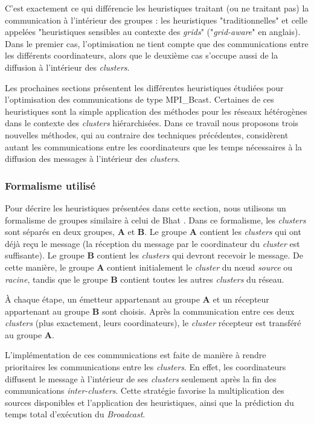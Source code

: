 C'est exactement ce qui différencie les heuristiques traitant (ou
ne traitant pas) la communication à l'intérieur des groupes : les
heuristiques "traditionnelles" et celle appelées "heuristiques
sensibles au contexte des \textit{grids}" ("\emph{grid-aware}"
en anglais). Dans le premier cas, l'optimisation ne tient compte que
des communications entre les différents coordinateurs, alors que le
deuxième cas s'occupe aussi de la diffusion à l'intérieur des  \textit{clusters}. 


Les prochaines sections présentent les différentes heuristiques étudiées
pour l'optimisation des communications de type MPI\_Bcast. Certaines
de ces heuristiques sont la simple application des méthodes pour les
réseaux hétérogènes dans le contexte des  \textit{clusters} hiérarchisées. Dans
ce travail nous proposons trois nouvelles méthodes, qui au contraire
des techniques précédentes, considèrent autant les communications
entre les coordinateurs que les temps nécessaires à la diffusion des
messages à l'intérieur des  \textit{clusters}.


\subsubsection*{Formalisme utilisé}

Pour décrire les heuristiques présentées dans cette section, nous
utilisons un formalisme de groupes similaire à celui de Bhat \cite{Bhat03}.
Dans ce formalisme, les  \textit{clusters} sont séparés en deux groupes, \textbf{A}
et \textbf{B}. Le groupe \textbf{A} contient les  \textit{clusters} qui ont déjà
reçu le message (la réception du message par le coordinateur du
 \textit{cluster} est suffisante). Le groupe \textbf{B} contient les  \textit{clusters}
qui devront recevoir le message. De cette manière, le groupe \textbf{A}
contient initialement le  \textit{cluster} du n{\oe}ud \emph{source} ou \emph{racine},
tandis que le groupe \textbf{B} contient toutes les autres  \textit{clusters}
du réseau.

À chaque étape, un émetteur appartenant au groupe \textbf{A} et un
récepteur appartenant au groupe \textbf{B} sont choisis. Après la
communication entre ces deux  \textit{clusters} (plus exactement, leurs coordinateurs),
le \textit{cluster} récepteur est transféré au groupe \textbf{A}. 

L'implémentation de ces communications est faite de manière à rendre
prioritaires les communications entre les  \textit{clusters}. En effet, les coordinateurs
diffusent le message à l'intérieur de ses  \textit{clusters} seulement après
la fin des communications \textit{inter-clusters}. Cette stratégie favorise
la multiplication des sources disponibles et l'application des heuristiques,
ainsi que la prédiction du temps total d'exécution du \textit{Broadcast}.

